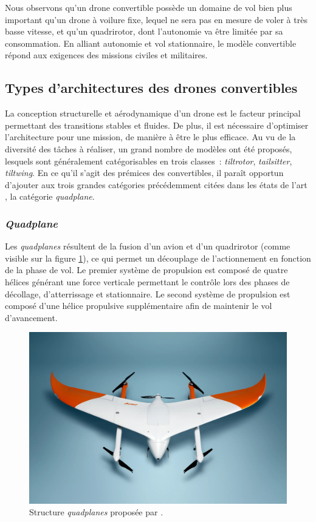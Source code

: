     Nous observons qu'un drone convertible possède un domaine de vol bien plus important qu'un drone à voilure fixe, lequel ne sera pas en mesure de voler à très basse vitesse, et qu'un quadrirotor, dont l'autonomie va être limitée par sa consommation.
    En alliant autonomie et vol stationnaire, le modèle convertible répond aux exigences des missions civiles et militaires.

    \subsection{Types d'architectures des drones convertibles}
    \label{sec:archConvertible}
    La conception structurelle et aérodynamique d'un drone est le facteur principal permettant des transitions stables et fluides. De plus, il est nécessaire d'optimiser l'architecture pour une mission, de manière à être le plus efficace. Au vu de la diversité des tâches à réaliser, un grand nombre de modèles ont été proposés, lesquels sont généralement catégorisables en trois classes : \textit{tiltrotor}, \textit{tailsitter}, \textit{tiltwing}. 
    En ce qu'il s'agit des prémices des convertibles, il paraît opportun d'ajouter aux trois grandes catégories précédemment citées dans les états de l'art \cite{saeed_survey_2018,ducard_review_2021, review_2022}, la catégorie \textit{quadplane}.

    
        \subsubsection*{\textit{Quadplane}}
        Les \textit{quadplanes} résultent de la fusion d'un avion et d'un quadrirotor (comme visible sur la figure \ref{fig:quadplane}), ce qui permet un découplage de l'actionnement en fonction de la phase de vol. Le premier système de propulsion est composé de quatre hélices générant une force verticale permettant le contrôle lors des phases de décollage, d'atterrissage et stationnaire. Le second système de propulsion est composé d'une hélice propulsive supplémentaire afin de maintenir le vol d'avancement.

        \begin{figure}[ht!]
            \centering
                \includegraphics[width=0.6\columnwidth]{figures/Avy-Drone-quadplane.jpg}
                \caption{Structure \textit{quadplanes} proposée par \cite{Avy_2023}.}
                \label{fig:quadplane}
        \end{figure}
        

